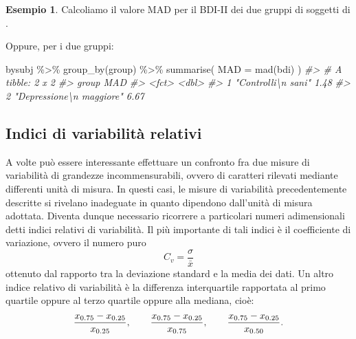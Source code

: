 \documentclass[
  10pt,
  italian,
  a4paper,
  extrafontsizes,onecolumn,openright
  ]{memoir}
\newenvironment{Shaded}{\begin{snugshade}}{\end{snugshade}}
\newcommand{\AttributeTok}[1]{\textcolor[rgb]{0.77,0.63,0.00}{#1}}
\newcommand{\CommentTok}[1]{\textcolor[rgb]{0.56,0.35,0.01}{\textit{#1}}}
\newcommand{\FloatTok}[1]{\textcolor[rgb]{0.00,0.00,0.81}{#1}}
\newcommand{\FunctionTok}[1]{\textcolor[rgb]{0.00,0.00,0.00}{#1}}
\newcommand{\NormalTok}[1]{#1}
\newcommand{\SpecialCharTok}[1]{\textcolor[rgb]{0.00,0.00,0.00}{#1}}
\theoremstyle{definition}
\theoremstyle{definition}
\newtheorem{example}{Esempio}[chapter]
\theoremstyle{definition}
\theoremstyle{definition}
\theoremstyle{remark}
\begin{document}
\begin{example}

Calcoliamo il valore MAD per il BDI-II dei due gruppi di soggetti di \textcite{zetschefuture2019}.

\begin{Shaded}
\end{Shaded}

Oppure, per i due gruppi:

\begin{Shaded}
\begin{Highlighting}[]
\NormalTok{bysubj }\SpecialCharTok{\%\textgreater{}\%} 
  \FunctionTok{group\_by}\NormalTok{(group) }\SpecialCharTok{\%\textgreater{}\%} 
  \FunctionTok{summarise}\NormalTok{(}
    \AttributeTok{MAD =} \FunctionTok{mad}\NormalTok{(bdi)}
\NormalTok{  ) }
\CommentTok{\#\textgreater{} \# A tibble: 2 x 2}
\CommentTok{\#\textgreater{}   group                      MAD}
\CommentTok{\#\textgreater{}   \textless{}fct\textgreater{}                    \textless{}dbl\textgreater{}}
\CommentTok{\#\textgreater{} 1 "Controlli\textbackslash{}n sani"        1.48}
\CommentTok{\#\textgreater{} 2 "Depressione\textbackslash{}n maggiore"  6.67}
\end{Highlighting}
\end{Shaded}

\end{example}

\hypertarget{indici-di-variabilituxe0-relativi}{%
\subsection{Indici di variabilità relativi}\label{indici-di-variabilituxe0-relativi}}

A volte può essere interessante effettuare un confronto fra due misure
di variabilità di grandezze incommensurabili, ovvero di caratteri
rilevati mediante differenti unità di misura. In questi casi, le misure
di variabilità precedentemente descritte si rivelano inadeguate in
quanto dipendono dall'unità di misura adottata. Diventa dunque
necessario ricorrere a particolari numeri adimensionali detti indici
relativi di variabilità. Il più importante di tali indici è il
coefficiente di variazione, ovvero il numero puro
\[C_v = \frac{\sigma}{\bar{x}}\] ottenuto dal rapporto tra la deviazione
standard e la media dei dati. Un altro indice relativo di variabilità è
la differenza interquartile rapportata al primo quartile oppure al terzo
quartile oppure alla mediana, cioè:
\[\frac{x_{0.75} - x_{0.25}}{x_{0.25}}, \qquad \frac{x_{0.75} - x_{0.25}}{x_{0.75}}, \qquad \frac{x_{0.75} - x_{0.25}}{x_{0.50}}.\notag\]
\end{document}
